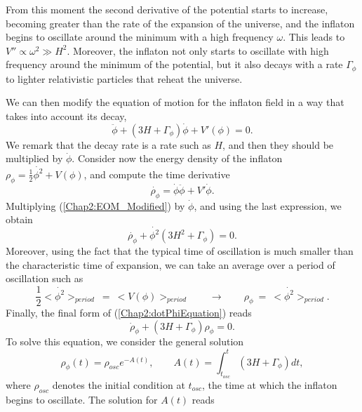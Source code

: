 \documentclass[11pt,a4paper,twoside]{book}
\begin{document}
From this moment the second derivative of the potential starts to increase, becoming greater than the rate of the expansion of the universe, and the inflaton begins to oscillate around the minimum with a high frequency $\omega$. This leads to $ V'' \propto \omega^{2} \gg H^{2} $.
Moreover, the inflaton not only starts to oscillate with high frequency around the minimum of the potential, but it also decays with a rate $\Gamma_{\phi}$ to lighter relativistic particles that reheat the universe.

We can then modify the equation of motion for the inflaton field in a way that takes into account its decay,
\begin{equation}
	\label{Chap2:EOM_Modified}
	\ddot{\phi} + (3H + \Gamma_{\phi})\dot{\phi} + V'(\phi) = 0.
\end{equation}
We remark that the decay rate is a rate such as $H  $,  and then they should be multiplied by $\dot{\phi}$.
Consider now the energy density of the inflaton $\rho_{\phi} = \frac{1}{2} \dot{\phi^{2}} + V(\phi)$, and compute the time derivative
\begin{equation}
	\label{Chap2:dotPhi}
	\dot{\rho_{\phi}}=\dot{\phi}\ddot{\phi} + V'\dot{\phi}.
\end{equation}
Multiplying (\ref{Chap2:EOM_Modified}) by $\dot{\phi}$, and using the last expression, we obtain
\begin{equation}
	\label{Chap2:dotPhiEquation}
	\dot{\rho_{\phi}} + \dot{\phi^{2}}(3H^{2} + \Gamma_{\phi}) = 0.
\end{equation}
Moreover, using the fact that the typical time of oscillation is much smaller than the characteristic time of expansion, we can take an average over a period of oscillation such as
\begin{equation}
	\label{Chap2:oscillationAverage}
	\dfrac{1}{2} <\dot{\phi^{2}}>_{period}\ =\ <V(\phi)>_{period}\qquad \rightarrow\qquad \rho_{\phi}\ =\ <\dot{\phi^{2}}>_{period}.
\end{equation}
Finally, the final form of (\ref{Chap2:dotPhiEquation}) reads
\begin{equation}
	\label{Chap2:FinalEqRho}
\dot{\rho}_{\phi} + (3H + \Gamma_{\phi})\rho_{\phi} = 0	.
\end{equation}
To solve this equation, we consider the general solution
\begin{equation}
	\label{Chap2:rhoSolution1}
	\rho_{\phi}(t)=\rho_{osc}e^{-A(t)}, \qquad A(t)=\int_{t_{osc}}^{t}(3H+\Gamma_{\phi})dt,
\end{equation}
where $ \rho_{osc} $ denotes the initial condition at $ t_{osc} $, the time at which the inflaton begins to oscillate. The solution for $ A(t) $ reads
\end{document}
